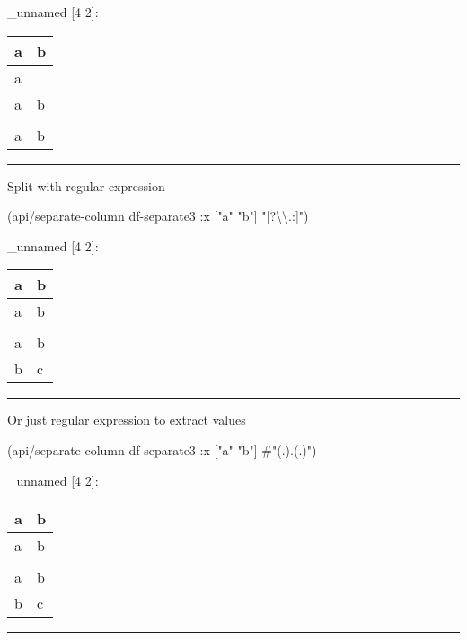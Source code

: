 \documentclass[]{article}
\newenvironment{Shaded}{\begin{snugshade}}{\end{snugshade}}
\newcommand{\StringTok}[1]{\textcolor[rgb]{0.31,0.60,0.02}{#1}}
\newcommand{\SpecialStringTok}[1]{\textcolor[rgb]{0.31,0.60,0.02}{#1}}
\newcommand{\AttributeTok}[1]{\textcolor[rgb]{0.77,0.63,0.00}{#1}}
\newcommand{\NormalTok}[1]{#1}
\begin{document}
\_unnamed {[}4 2{]}:

\begin{longtable}[]{@{}ll@{}}
\toprule
a & b\tabularnewline
\midrule
\endhead
a &\tabularnewline
a & b\tabularnewline
&\tabularnewline
a & b\tabularnewline
\bottomrule
\end{longtable}

\begin{center}\rule{0.5\linewidth}{0.5pt}\end{center}

Split with regular expression

\begin{Shaded}
\begin{Highlighting}[]
\NormalTok{(api/separate-column df-separate3 }\AttributeTok{:x}\NormalTok{ [}\StringTok{"a"} \StringTok{"b"}\NormalTok{] }\StringTok{"[?}\NormalTok{\textbackslash{}\textbackslash{}}\StringTok{.:]"}\NormalTok{)}
\end{Highlighting}
\end{Shaded}

\_unnamed {[}4 2{]}:

\begin{longtable}[]{@{}ll@{}}
\toprule
a & b\tabularnewline
\midrule
\endhead
a & b\tabularnewline
&\tabularnewline
a & b\tabularnewline
b & c\tabularnewline
\bottomrule
\end{longtable}

\begin{center}\rule{0.5\linewidth}{0.5pt}\end{center}

Or just regular expression to extract values

\begin{Shaded}
\begin{Highlighting}[]
\NormalTok{(api/separate-column df-separate3 }\AttributeTok{:x}\NormalTok{ [}\StringTok{"a"} \StringTok{"b"}\NormalTok{] }\SpecialStringTok{#"(.).(.)"}\NormalTok{)}
\end{Highlighting}
\end{Shaded}

\_unnamed {[}4 2{]}:

\begin{longtable}[]{@{}ll@{}}
\toprule
a & b\tabularnewline
\midrule
\endhead
a & b\tabularnewline
&\tabularnewline
a & b\tabularnewline
b & c\tabularnewline
\bottomrule
\end{longtable}

\begin{center}\rule{0.5\linewidth}{0.5pt}\end{center}
\end{document}
